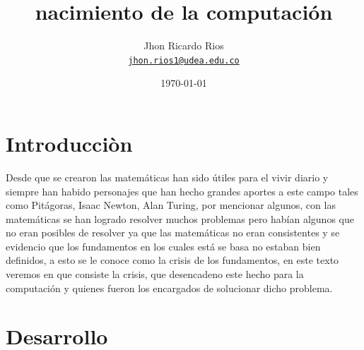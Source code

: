 \documentclass[11pt]{article}
\title{nacimiento de la computación}
\author{Jhon Ricardo Rios\\%
    \href{mailto:jhon.rios1@udea.edu.co}{\texttt{jhon.rios1@udea.edu.co}} %
    }
\date{\today}
\begin{document}
{
\maketitle

}


\section{Introducci{\`o}n}

\begin{center}
Desde que se crearon las matemáticas han sido útiles para el vivir diario y siempre han habido
personajes que han hecho grandes aportes a este campo tales como Pitágoras, Isaac Newton, Alan Turing, por mencionar algunos,
con las matemáticas se han logrado resolver muchos problemas pero habían algunos que no eran posibles de resolver ya que las matemáticas no eran consistentes y se evidencio que los fundamentos en los cuales está se basa no estaban bien definidos, a esto se le conoce como la crisis de los fundamentos, en este texto veremos en que consiste la crisis, que desencadeno este hecho para la computación y quienes fueron los encargados de solucionar dicho problema.
\end{center}

\section{Desarrollo}
\end{document}

